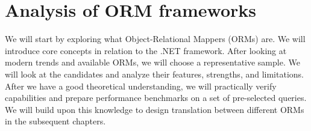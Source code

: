 \chapter{Analysis of ORM frameworks}

We will start by exploring what Object-Relational Mappers (ORMs) are. We will introduce core concepts in relation to the .NET framework. After looking at modern trends and available ORMs, we will choose a representative sample. We will look at the candidates and analyze their features, strengths, and limitations. After we have a good theoretical understanding, we will practically verify capabilities and prepare performance benchmarks on a set of pre-selected queries. We will build upon this knowledge to design translation between different ORMs in the subsequent chapters.







